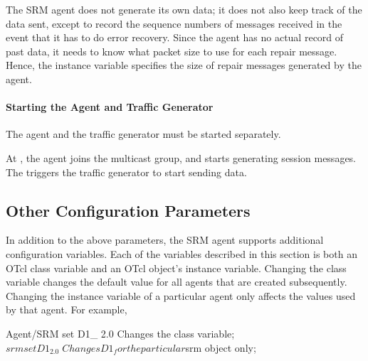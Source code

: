 The SRM agent does not generate its own data;
it does not also keep track of the data sent,
except to record the sequence numbers of messages received
in the event that it has to do error recovery.
Since the agent has no actual record of past data,
it needs to know what packet size to use for each repair message.
Hence, the instance variable  specifies the size
of repair messages generated by the agent.

\paragraph{Starting the Agent and Traffic Generator}
The agent and the traffic generator must be started separately.
\begin{program}
        {\bfseries{}}
        {\bfseries{}}
\end{program}
At , the agent joins the multicast group, and 
starts generating session messages.
The  triggers the traffic generator to start sending
data.

\subsection{Other Configuration Parameters}
\label{sec:config-param}

In addition to the above parameters,
the SRM agent supports additional configuration variables.
Each of the variables described in this section is
both an OTcl class variable and an OTcl object's instance variable.
Changing the class variable changes the default value
for all agents that are created subsequently.
Changing the instance variable of a particular agent
only affects the values used by that agent.
For example,
\begin{program}
                Agent/SRM set D1_ 2.0 \; Changes the class variable;
                $srm set D1_ 2.0        \; Changes D1_ for the particular $srm object only;
\end{program}

